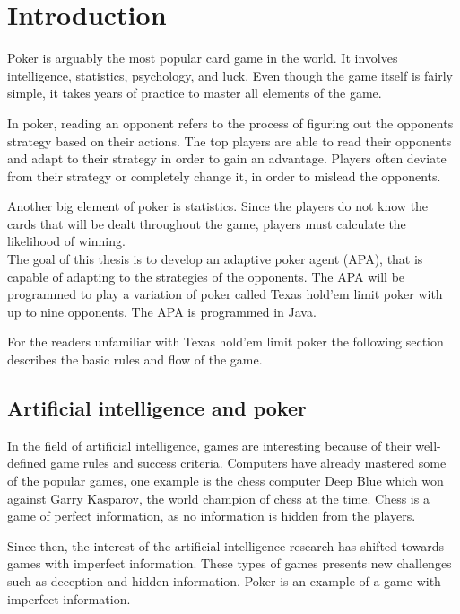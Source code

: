 \section*{Introduction}
Poker is arguably the most popular card game in the world. It involves intelligence, statistics, psychology, and luck. Even though the game itself is fairly simple, it takes years of practice to master all elements of the game.

In poker, reading an opponent refers to the process of figuring out the opponents strategy based on their actions. The top players are able to read their opponents and adapt to their strategy in order to gain an advantage. Players often deviate from their strategy or completely change it, in order to mislead the opponents.

Another big element of poker is statistics. Since the players do not know the cards that will be dealt throughout the game, players must calculate the likelihood of winning. \\

The goal of this thesis is to develop an adaptive poker agent (APA), that is capable of adapting to the strategies of the opponents. The APA will be programmed to play a variation of poker called Texas hold'em limit poker with up to nine opponents. The APA is programmed in Java.

For the readers unfamiliar with Texas hold'em limit poker the following section describes the basic rules and flow of the game.



\subsection*{Artificial intelligence and poker}
In the field of artificial intelligence, games are interesting because of their well-defined game rules and success criteria.
Computers have already mastered some of the popular games, one example is the chess computer Deep Blue which won against Garry Kasparov, the world champion of chess at the time.
Chess is a game of perfect information, as no information is hidden from the players.

Since then, the interest of the artificial intelligence research has shifted towards games with imperfect information. These types of games presents new challenges such as deception and hidden information. Poker is an example of a game with imperfect information.\\

